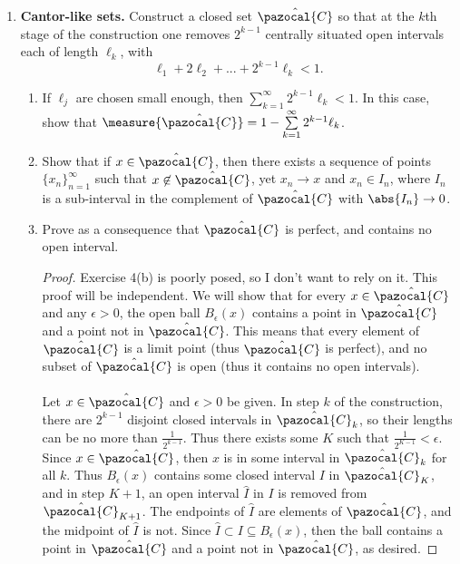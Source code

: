 \documentclass[letterpaper]{article}
\renewcommand{\mathcal}[1]{\pazocal{#1}}
\begin{document}
\begin{enumerate}
\begin{enumerate}
\begin{proof}
		\end{proof}
	\end{enumerate}

\setcounter{enumi}{3}
	\item \textbf{Cantor-like sets.} Construct a closed set $\hat{\mathcal{C}}$ so that at the $k$th stage of the construction one removes $2^{k−1}$ centrally situated open intervals each of length $\ell_k$, with
	$$\ell_1 + 2\ell_2 + ... + 2^{k-1}\ell_k < 1.$$
	\begin{enumerate}[label=(\alph*)]
		\item If $\ell_j$ are chosen small enough, then $\sum\limits_{k=1}^\infty 2^{k-1}\ell_k < 1$. In this case, show that $\measure{\hat{\mathcal{C}}} = 1 - \sum\limits_{k=1}^\infty 2^{k-1}\ell_k$.
		\item Show that if $x\in\hat{\mathcal{C}}$, then there exists a sequence of points $\{x_n\}_{n=1}^\infty$ such that $x\not\in\hat{\mathcal{C}}$, yet $x_n\to x$ and $x_n\in I_n$, where $I_n$ is a sub-interval in the complement of $\hat{\mathcal{C}}$ with $\abs{I_n}\to0$.
		\item Prove as a consequence that $\hat{\mathcal{C}}$ is perfect, and contains no open interval.
		\begin{proof}
		Exercise 4(b) is poorly posed, so I don't want to rely on it. This proof will be independent. We will show that for every $x\in\hat{\mathcal{C}}$ and any $\epsilon>0$, the open ball $B_\epsilon(x)$ contains a point in $\hat{\mathcal{C}}$ and a point not in $\hat{\mathcal{C}}$. This means that every element of $\hat{\mathcal{C}}$ is a limit point (thus $\hat{\mathcal{C}}$ is perfect), and no subset of $\hat{\mathcal{C}}$ is open (thus it contains no open intervals). \\
		\mbox{} \\
		Let $x\in\hat{\mathcal{C}}$ and $\epsilon>0$ be given. In step $k$ of the construction, there are $2^{k-1}$ disjoint closed intervals in $\hat{\mathcal{C}}_k$, so their lengths can be no more than $\frac{1}{2^{k-1}}$. Thus there exists some $K$ such that $\frac{1}{2^{K-1}}<\epsilon$. Since $x\in\hat{\mathcal{C}}$, then $x$ is in some interval in $\hat{\mathcal{C}}_k$ for all $k$. Thus $B_\epsilon(x)$ contains some closed interval $I$ in $\hat{\mathcal{C}}_K$, and in step $K+1$, an open interval $\hat{I}$ in $I$ is removed from $\hat{\mathcal{C}}_{K+1}$. The endpoints of $\hat{I}$ are elements of $\hat{\mathcal{C}}$, and the midpoint of $\hat{I}$ is not. Since $\hat{I}\subset I\subseteq B_\epsilon(x)$, then the ball contains a point in $\hat{\mathcal{C}}$ and a point not in $\hat{\mathcal{C}}$, as desired.

\end{proof}
\end{enumerate}
\end{enumerate}
\end{document}

